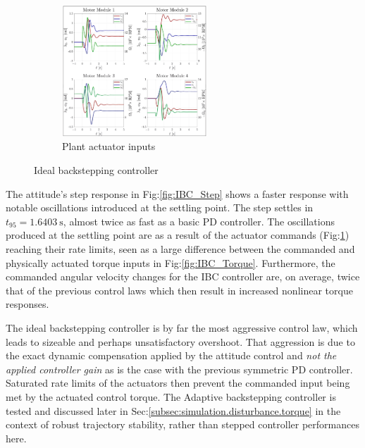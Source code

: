 \begin{figure}[htbp]
\begin{subfigure}{\textwidth}
\centering
\includegraphics[width=0.6\textwidth]{graphs/IBC_Input}
\vspace{-8pt}
\caption{Plant actuator inputs}
\label{fig:IBC_Input}
\end{subfigure}
\vspace{-8pt}
\caption{Ideal backstepping controller}
\label{fig:IBC_controller_result}
\vspace{-10pt}
\end{figure}
\par
The attitude's step response in Fig:\ref{fig:IBC_Step} shows a faster response with notable oscillations introduced at the settling point. The step settles in $t_{95}=1.6403~\text{s}$, almost twice as fast as a basic PD controller. The oscillations produced at the settling point are as a result of the actuator commands (Fig:\ref{fig:IBC_Input}) reaching their rate limits, seen as a large difference between the commanded and physically actuated torque inputs in Fig:\ref{fig:IBC_Torque}. Furthermore, the commanded angular velocity changes for the IBC controller are, on average, twice that of the previous control laws which then result in increased nonlinear torque responses.
\par
The ideal backstepping controller is by far the most aggressive control law, which leads to sizeable and perhaps unsatisfactory overshoot. That aggression is due to the exact dynamic compensation applied by the attitude control and \emph{not the applied controller gain} as is the case with the previous symmetric PD controller. Saturated rate limits of the actuators then prevent the commanded input being met by the actuated control torque. The Adaptive backstepping controller is tested and discussed later in Sec:\ref{subsec:simulation.disturbance.torque} in the context of robust trajectory stability, rather than stepped controller performances here.
